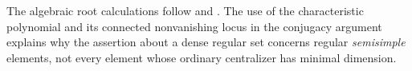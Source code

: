 The algebraic root calculations follow
\cite[Sections 8 and 15--16]{humphreys} and
\cite[Sections 19--20]{etingof}. The use of the characteristic
polynomial and its connected nonvanishing locus in the conjugacy
argument explains why the assertion about a dense regular set
concerns regular \emph{semisimple} elements, not every element
whose ordinary centralizer has minimal dimension.

